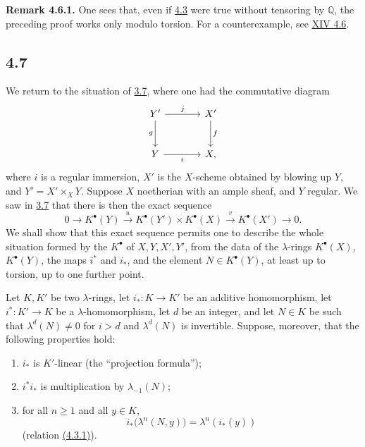 \textbf{Remark 4.6.1.} One sees that, even if \hyperlink{sga6.e07.thm.4-3}{4.3} were true without tensoring by \(\mathbb Q\), the preceding proof works only modulo torsion. For a counterexample, see \hyperlink{sga6.e14.para.4-6}{XIV 4.6}.

\subsection*{4.7}

We return to the situation of \hyperlink{sga6.e07.thm.3-7}{3.7}, where one had the commutative diagram
\[
\begin{tikzcd}[column sep=large,row sep=large]
Y' \arrow[r,"j"] \arrow[d,"g"'] & X' \arrow[d,"f"]\\
Y \arrow[r,"i"'] & X,
\end{tikzcd}
\]
where \(i\) is a regular immersion, \(X'\) is the \(X\)-scheme obtained by blowing up \(Y\), and \(Y'=X'\times_XY\). Suppose \(X\) noetherian with an ample sheaf, and \(Y\) regular. We saw in \hyperlink{sga6.e07.thm.3-7}{3.7} that there is then the exact sequence
\[
0\longrightarrow K^\bullet(Y)\xrightarrow{u}
K^\bullet(Y')\times K^\bullet(X)\xrightarrow{v}
K^\bullet(X')\longrightarrow0.
\]
We shall show that this exact sequence permits one to describe the whole situation formed by the \(K^\bullet\) of \(X,Y,X',Y'\), from the data of the \(\lambda\)-rings \(K^\bullet(X)\), \(K^\bullet(Y)\), the maps \(i^*\) and \(i_*\), and the element \(N\in K^\bullet(Y)\), at least up to torsion, up to one further point.

Let \(K,K'\) be two \(\lambda\)-rings, let \(i_*:K\to K'\) be an additive homomorphism, let \(i^*:K'\to K\) be a \(\lambda\)-homomorphism, let \(d\) be an integer, and let \(N\in K\) be such that \(\lambda^d(N)\ne0\) for \(i>d\) and \(\lambda^d(N)\) is invertible. Suppose, moreover, that the following properties hold:
\begin{enumerate}[label=\roman*)]
\item \(i_*\) is \(K'\)-linear (the ``projection formula'');
\item \(i^*i_*\) is multiplication by \(\lambda_{-1}(N)\);
\item for all \(n\ge1\) and all \(y\in K\),
\[
 i_*\bigl(\lambda^n(N,y)\bigr)=\lambda^n(i_*(y))
\]
(relation \hyperlink{sga6.e07.eq.4-3-1}{(4.3.1)}).
\end{enumerate}


